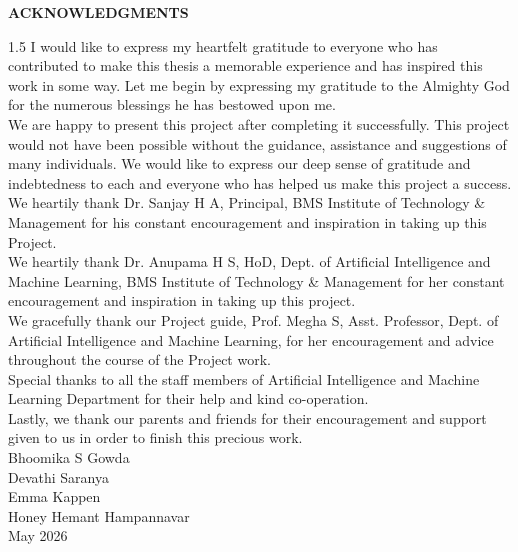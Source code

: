  \begin{center}\vspace{1.5in}
	\bfseries\LARGE{ACKNOWLEDGMENTS} \\
\end{center}\vspace{0.2in}
	   
	   
	  
\normalsize{\begin{spacing}{1.5}
\noindent 
I would like to express my heartfelt gratitude to everyone who has contributed to make this thesis a memorable experience and has inspired this work in some way. Let me begin by expressing my gratitude to the Almighty God for the numerous blessings he has bestowed upon me.\\

\noindent
We are happy to present this project after completing it successfully. This project would not have been possible without the guidance, assistance and suggestions of many individuals. We would like to express our deep sense of gratitude and indebtedness to each and everyone who has helped us make this project a success.\\

\noindent
We heartily thank Dr. Sanjay H A, Principal, BMS Institute of Technology \& Management for his constant encouragement and inspiration in taking up this Project.\\

\noindent
We heartily thank Dr. Anupama H S, HoD, Dept. of Artificial Intelligence and Machine Learning, BMS Institute of Technology \& Management for her constant encouragement and inspiration in taking up this project.\\

\noindent
We gracefully thank our Project guide, Prof. Megha S, Asst. Professor, Dept. of Artificial Intelligence and Machine Learning, for her encouragement and advice throughout the course of the Project work.\\

\noindent
Special thanks to all the staff members of Artificial Intelligence and Machine Learning Department for their help and kind co-operation. \\

\noindent
Lastly, we thank our parents and friends for their encouragement and support given to us in order to finish this precious work.\\

{\noindent
Bhoomika S Gowda\\
Devathi Saranya\\
Emma Kappen\\
Honey Hemant Hampannavar\\
\noindent
May 2026
}

\end{spacing}}
